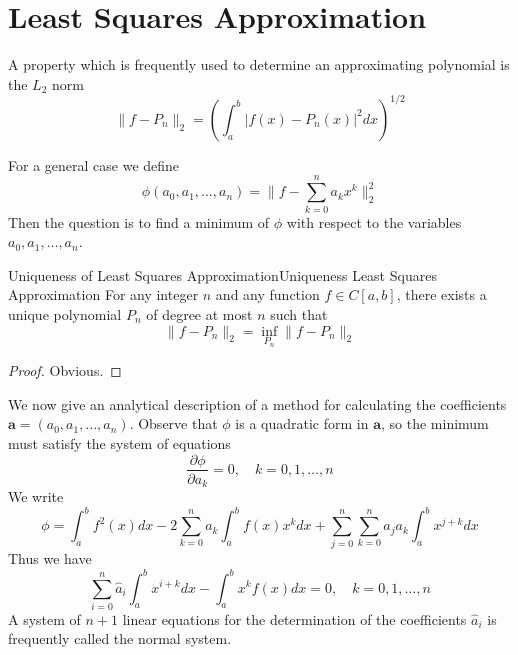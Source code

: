 \documentclass[../main.tex]{subfiles}
\begin{document}
\section{Least Squares Approximation}
A property which is frequently used to determine an approximating polynomial is the $L_2$ norm
\begin{equation}
	\| f - P_n \|_2 = \left( \int_a^b |f(x) - P_n(x)|^2 dx \right)^{1/2}
\end{equation}

For a general case we define
\begin{equation}
	\phi(a_0, a_1, \dots, a_n) = \| f - \sum_{k=0}^n a_k x^k \|_2^2
\end{equation}
Then the question is to find a minimum of $\phi$ with respect to the variables $a_0, a_1, \dots, a_n$.

\begin{theorem}{Uniqueness of Least Squares Approximation}{Uniqueness Least Squares Approximation}
	For any integer $n$ and any function $f \in C[a,b]$, there exists a unique polynomial $P_n$ of degree at most $n$ such that
	\begin{equation}
		\| f - P_n \|_2 = \inf_{P_n} \| f - P_n \|_2
	\end{equation}
\end{theorem}
\begin{proof}
	Obvious.
\end{proof}

We now give an analytical description of a method for calculating the coefficients $\boldsymbol{a} = (a_0, a_1, \dots, a_n)$. Observe that $\phi$ is a quadratic form in $\boldsymbol{a}$, so the minimum must satisfy the system of equations
\begin{equation*}
	\frac{\partial \phi}{\partial a_k} = 0, \quad k = 0, 1, \dots, n
\end{equation*}
We write
\begin{equation*}
	\phi = \int_a^b f^2(x) dx - 2 \sum_{k=0}^n a_k \int_a^b f(x) x^k dx + \sum_{j=0}^n \sum_{k=0}^n a_j a_k \int_a^b x^{j+k} dx
\end{equation*}
Thus we have
\begin{equation*}
	\sum_{i=0}^n \hat{a}_i \int_a^b x^{i+k} dx - \int_a^b x^k f(x) dx = 0, \quad k = 0, 1, \dots, n
\end{equation*}
A system of $n+1$ linear equations for the determination of the coefficients $\hat{a}_i$ is frequently called the normal system.
\end{document}
